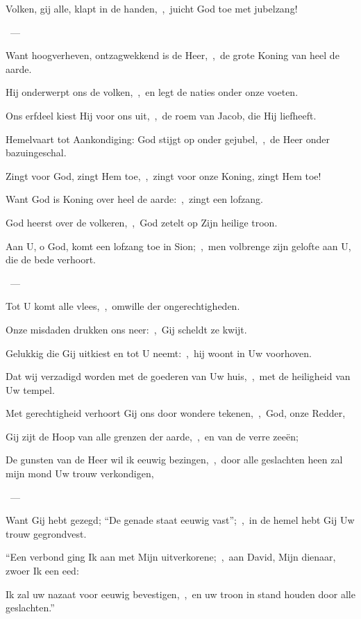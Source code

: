 \documentclass[12pt,twoside,a5paper]{article}
\begin{document}
\begin{halfparskip}
  Volken, gij alle, klapt in de handen,~\sep\ juicht God toe met jubelzang!

  ~--- 

  Want hoogverheven, ontzagwekkend is de Heer,~\sep\ de grote Koning van heel de aarde.

  Hij onderwerpt ons de volken,~\sep\ en legt de naties onder onze voeten.

  Ons erfdeel kiest Hij voor ons uit,~\sep\ de roem van Jacob, die Hij liefheeft.

  Hemelvaart tot Aankondiging: God stijgt op onder gejubel,~\sep\ de Heer onder bazuingeschal.

  Zingt voor God, zingt Hem toe,~\sep\ zingt voor onze Koning, zingt Hem toe!

  Want God is Koning over heel de aarde:~\sep\ zingt een lofzang.

  God heerst over de volkeren,~\sep\ God zetelt op Zijn heilige troon.
\end{halfparskip}


\begin{halfparskip}
  Aan U, o God, komt een lofzang toe in Sion;~\sep\ men volbrenge zijn gelofte aan U, die de bede verhoort.

  ~--- 

  Tot U komt alle vlees,~\sep\ omwille der ongerechtigheden.

  Onze misdaden drukken ons neer:~\sep\ Gij scheldt ze kwijt.

  Gelukkig die Gij uitkiest en tot U neemt:~\sep\ hij woont in Uw voorhoven.

  Dat wij verzadigd worden met de goederen van Uw huis,~\sep\ met de heiligheid van Uw tempel.

  Met gerechtigheid verhoort Gij ons door wondere tekenen,~\sep\ God, onze Redder,

  Gij zijt de Hoop van alle grenzen der aarde,~\sep\ en van de verre zeeën;
\end{halfparskip}


\begin{halfparskip}
  De gunsten van de Heer wil ik eeuwig bezingen,~\sep\ door alle geslachten heen zal mijn mond Uw trouw verkondigen,

  ~--- 

  Want Gij hebt gezegd; ``De genade staat eeuwig vast'';~\sep\ in de hemel hebt Gij Uw trouw gegrondvest.

  ``Een verbond ging Ik aan met Mijn uitverkorene;~\sep\ aan David, Mijn dienaar, zwoer Ik een eed:

  Ik zal uw nazaat voor eeuwig bevestigen,~\sep\ en uw troon in stand houden door alle geslachten.''
\end{halfparskip}
\end{document}
